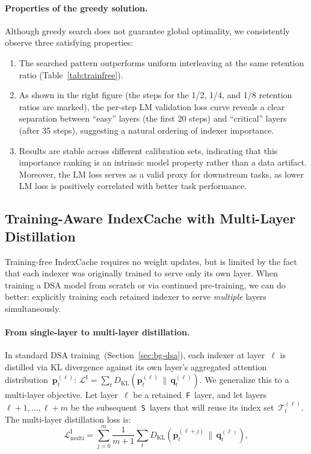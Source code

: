 \paragraph{Properties of the greedy solution.}
Although greedy search does not guarantee global optimality, we consistently observe three satisfying properties:
\begin{enumerate}[leftmargin=*,itemsep=1pt,label=(\arabic*)]
    \item The searched pattern outperforms uniform interleaving at the same retention ratio (Table~\ref{tab:trainfree}).
    \item As shown in the right figure (the steps for the 1/2, 1/4, and 1/8 retention ratios are marked), the per-step LM validation loss curve reveals a clear separation between ``easy'' layers (the first 20 steps) and ``critical'' layers (after 35 steps), suggesting a natural ordering of indexer importance.
    \item Results are stable across different calibration sets, indicating that this importance ranking is an intrinsic model property rather than a data artifact. Moreover, the LM loss serves as a valid proxy for downstream tasks, as lower LM loss is positively correlated with better task performance.
\end{enumerate}


\subsection{Training-Aware IndexCache with Multi-Layer Distillation}
\label{sec:method-trainaware}

Training-free IndexCache requires no weight updates, but is limited by the fact that each indexer was originally trained to serve only its own layer.
When training a DSA model from scratch or via continued pre-training, we can do better: explicitly training each retained indexer to serve \emph{multiple} layers simultaneously.

\paragraph{From single-layer to multi-layer distillation.}
In standard DSA training~(Section~\ref{sec:bg-dsa}), each indexer at layer~$\ell$ is distilled via KL divergence against its own layer's aggregated attention distribution~$\mathbf{p}^{(\ell)}_t$: $\mathcal{L}^{\mathrm{I}}
    = \sum_{t} D_{\mathrm{KL}}\!\left(
        \mathbf{p}^{(\ell)}_{t} \,\big\|\, \mathbf{q}^{(\ell)}_t
      \right)$.
We generalize this to a multi-layer objective.
Let layer~$\ell$ be a retained~\texttt{F}~layer, and let layers~$\ell{+}1, \ldots, \ell{+}m$ be the subsequent~\texttt{S}~layers that will reuse its index set~$\mathcal{T}^{(\ell)}_t$.
The multi-layer distillation loss is:
{\footnotesize
\begin{equation}
    \mathcal{L}^{\mathrm{I}}_{\mathrm{multi}}
    = \sum_{j=0}^{m} \frac{1}{m+1}\sum_{t}
      D_{\mathrm{KL}}\!\left(
        \mathbf{p}^{(\ell+j)}_{t} \,\big\|\, \mathbf{q}^{(\ell)}_t
      \right),
    \label{eq:multi-distill}
\end{equation}
}

